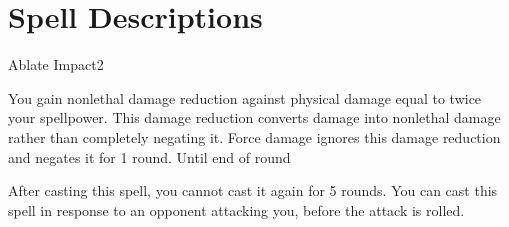 \section{Spell Descriptions}

\small


\begin{spellsection}{Ablate Impact}{2}
    \begin{spellheader}
    \end{spellheader}
    \begin{spellcontent}
        \begin{spelltargetinginfo}
        \end{spelltargetinginfo}
        \begin{spelleffects}
            \spelleffect You gain nonlethal damage reduction against physical damage equal to twice your spellpower. This damage reduction converts damage into nonlethal damage rather than completely negating it. Force damage ignores this damage reduction and negates it for 1 round.
            \spelldur Until end of round
        \end{spelleffects}
    \end{spellcontent}
    \begin{spellfooter}
        \spellnotes After casting this spell, you cannot cast it again for 5 rounds. You can cast this spell in response to an opponent attacking you, before the attack is rolled.
        \miscastexplode
    \end{spellfooter}
\end{spellsection}

